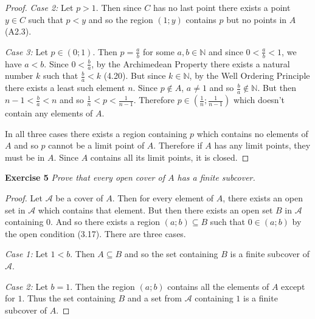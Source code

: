 \documentclass{article}
\begin{document}
\begin{flushleft}
\begin{proof}
\textit{Case 2:} Let $p>1$. Then since $C$ has no last point there exists a point $y \in C$ such that $p<y$ and so the region $(1;y)$ contains $p$ but no points in $A$ (A2.3).\newline

\textit{Case 3:} Let $p \in (0;1)$. Then $p=\frac{a}{b}$ for some $a,b \in \mathbb{N}$ and since $0 < \frac{a}{b} < 1$, we have $a<b$. Since $0<\frac{b}{a}$, by the Archimedean Property there exists a natural number $k$ such that $\frac{b}{a} < k$ (4.20). But since $k \in \mathbb{N}$, by the Well Ordering Principle there exists a least such element $n$. Since $p \notin A$, $a \neq 1$ and so $\frac{b}{a} \notin \mathbb{N}$. But then $n-1 < \frac{b}{a} < n$ and so $\frac{1}{n}<p<\frac{1}{n-1}$. Therefore $p \in \left( \frac{1}{n};\frac{1}{n-1} \right)$ which doesn't contain any elements of $A$.\newline

In all three cases there exists a region containing $p$ which contains no elements of $A$ and so $p$ cannot be a limit point of $A$. Therefore if $A$ has any limit points, they must be in $A$. Since $A$ contains all its limit points, it is closed.
\end{proof}

\textbf{Exercise 5}
\textsl{Prove that every open cover of $A$ has a finite subcover.}
\begin{proof}
Let $\mathcal{A}$ be a cover of $A$. Then for every element of $A$, there exists an open set in $\mathcal{A}$ which contains that element. But then there exists an open set $B$ in $\mathcal{A}$ containing $0$. And so there exists a region $(a;b) \subseteq B$ such that $0 \in (a;b)$ by the open condition (3.17). There are three cases.\newline

\textit{Case 1:} Let $1 < b$. Then $A \subseteq B$ and so the set containing $B$ is a finite subcover of $\mathcal{A}$.\newline

\textit{Case 2:} Let $b=1$. Then the region $(a;b)$ contains all the elements of $A$ except for $1$. Thus the set containing $B$ and a set from $\mathcal{A}$ containing $1$ is a finite subcover of $A$.\newline


\end{proof}
\end{flushleft}
\end{document}
